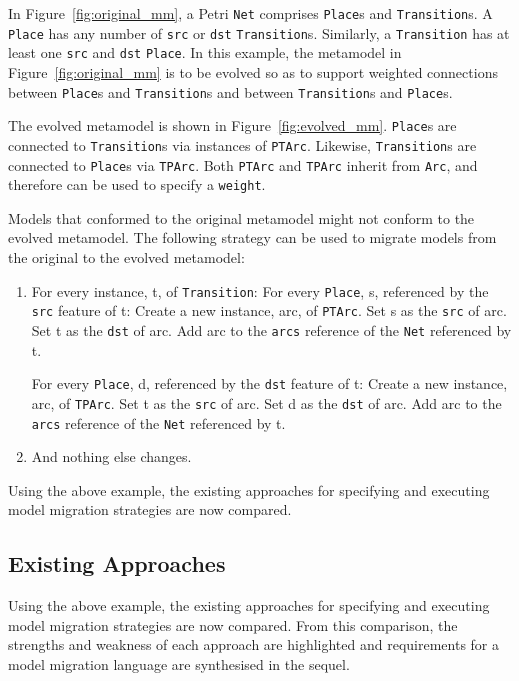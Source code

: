 In Figure~\ref{fig:original_mm}, a Petri \texttt{Net} comprises \texttt{Place}s and \texttt{Transition}s. A \texttt{Place} has any number of \texttt{src} or \texttt{dst} \texttt{Transition}s. Similarly, a \texttt{Transition} has at least one \texttt{src} and \texttt{dst} \texttt{Place}. In this example, the metamodel in Figure~\ref{fig:original_mm} is to be evolved so as to support weighted connections between \texttt{Place}s and \texttt{Transition}s and between \texttt{Transition}s and \texttt{Place}s.

The evolved metamodel is shown in Figure~\ref{fig:evolved_mm}. \texttt{Place}s are connected to \texttt{Transition}s via instances of \texttt{PTArc}. Likewise, \texttt{Transition}s are connected to \texttt{Place}s via \texttt{TPArc}. Both \texttt{PTArc} and \texttt{TPArc} inherit from \texttt{Arc}, and therefore can be used to specify a \texttt{weight}.

Models that conformed to the original metamodel might not conform to the evolved metamodel. The following strategy can be used to migrate models from the original to the evolved metamodel:

\begin{enumerate}
	\item For every instance, t, of \texttt{Transition}: 
	\subitem For every \texttt{Place}, s, referenced by the \texttt{src} feature of t: 
	\subsubitem Create a new instance, arc, of \texttt{PTArc}. 
	\subsubitem Set s as the \texttt{src} of arc. 
	\subsubitem Set t as the \texttt{dst} of arc. 
	\subsubitem Add arc to the \texttt{arcs} reference of the \texttt{Net} referenced by t.
	
	\subitem For every \texttt{Place}, d, referenced by the \texttt{dst} feature of t: 
	\subsubitem Create a new instance, arc, of \texttt{TPArc}. 
	\subsubitem Set t as the \texttt{src} of arc. 
	\subsubitem Set d as the \texttt{dst} of arc. 
	\subsubitem Add arc to the \texttt{arcs} reference of the \texttt{Net} referenced by t.
	
	\item And nothing else changes.
\end{enumerate}

Using the above example, the existing approaches for specifying and executing model migration strategies are now compared.


\subsection{Existing Approaches}
\label{subsec:existing_migration_languages}
Using the above example, the existing approaches for specifying and executing model migration strategies are now compared. From this comparison, the strengths and weakness of each approach are highlighted and requirements for a model migration language are synthesised in the sequel.

